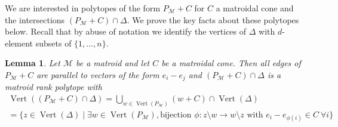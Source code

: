 \documentclass[12pt]{amsart}
\newcommand{\MM}{{\mathcal M}}
\newcommand{\Vt}{{\operatorname{Vert}}}
\theoremstyle{plain}
\newtheorem{Lem}[Thm]{Lemma}
\theoremstyle{definition}
\theoremstyle{remark}
\begin{document}
We are interested in polytopes of the form $P_\MM+C$ for $C$ a matroidal cone and the intersections $(P_\MM+C) \cap \Delta$. We prove the key facts about these polytopes below. Recall that by abuse of notation we identify the vertices of $\Delta$ with $d$-element subsets of $\{1, \ldots, n\}$.
\begin{Lem} \label{horribleequivalence}
Let $\MM$ be a matroid and let $C$ be a matroidal cone. Then all edges of $P_\MM+C$ are parallel to vectors of the form $e_i-e_j$ and $(P_\MM+C)\cap \Delta$ is a matroid rank polytope with
\begin{align}
\Vt((P_\MM+C) \cap \Delta)=\bigcup_{w \in \Vt(P_\MM)} (w+C) \cap \Vt(\Delta) \label{vertpmplusc1} \\
=\{z \in \Vt(\Delta) \mid \exists w \in \Vt(P_\MM),\text{bijection } \phi:z\setminus w \to w \setminus z\text{ with }e_i-e_{\phi(i)}\in C\ \forall i\} \label{vertpmplusc2}
\end{align}
\end{Lem}
\end{document}
